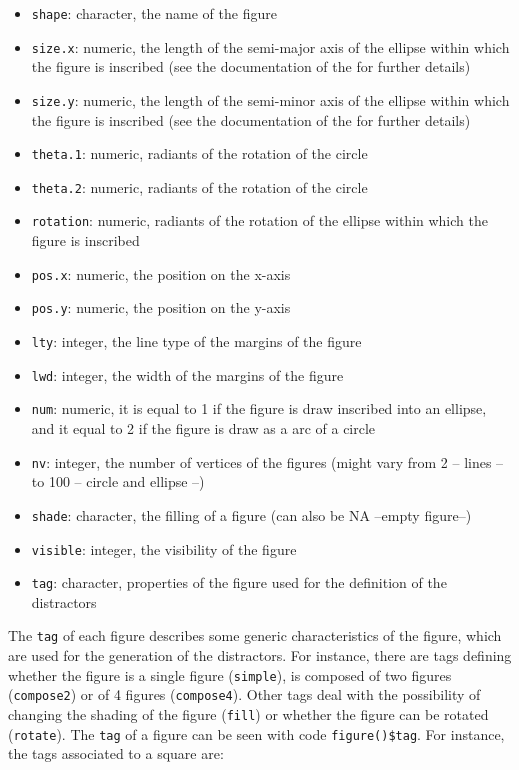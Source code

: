 \begin{itemize}
\tightlist
\item
  \texttt{shape}: character, the name of the figure
\item
  \texttt{size.x}: numeric, the length of the semi-major axis of the ellipse within which the figure is inscribed (see the documentation of the  for further details)
\item
  \texttt{size.y}: numeric, the length of the semi-minor axis of the ellipse within which the figure is inscribed (see the documentation of the  for further details)
\item
  \texttt{theta.1}: numeric, radiants of the rotation of the circle
\item
  \texttt{theta.2}: numeric, radiants of the rotation of the circle
\item
  \texttt{rotation}: numeric, radiants of the rotation of the ellipse within which the figure is inscribed
\item
  \texttt{pos.x}: numeric, the position on the x-axis
\item
  \texttt{pos.y}: numeric, the position on the y-axis
\item
  \texttt{lty}: integer, the line type of the margins of the figure
\item
  \texttt{lwd}: integer, the width of the margins of the figure
\item
  \texttt{num}: numeric, it is equal to 1 if the figure is draw inscribed into an ellipse, and it equal to 2 if the figure is draw as a arc of a circle
\item
  \texttt{nv}: integer, the number of vertices of the figures (might vary from 2 -- lines -- to 100 -- circle and ellipse --)
\item
  \texttt{shade}: character, the filling of a figure (can also be NA --empty figure--)
\item
  \texttt{visible}: integer, the visibility of the figure
\item
  \texttt{tag}: character, properties of the figure used for the definition of the distractors
\end{itemize}

The \texttt{tag} of each figure describes some generic characteristics of the figure, which are used for the generation of the distractors. For instance, there are tags defining whether the figure is a single figure (\texttt{simple}), is composed of two figures (\texttt{compose2}) or of 4 figures (\texttt{compose4}). Other tags deal with the possibility of changing the shading of the figure (\texttt{fill}) or whether the figure can be rotated (\texttt{rotate}). The \texttt{tag} of a figure can be seen with code \texttt{figure()\$tag}. For instance, the tags associated to a square are:

